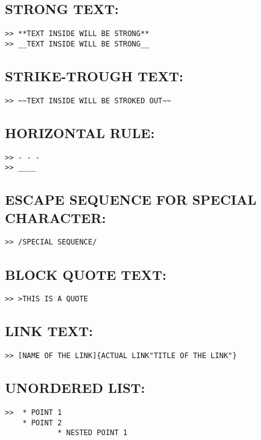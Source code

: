 \documentclass[11pt,british]{article}
\begin{document}
\subsection{STRONG TEXT:}
\begin{verbatim}
>> **TEXT INSIDE WILL BE STRONG**
>> __TEXT INSIDE WILL BE STRONG__
\end{verbatim}

\subsection{STRIKE-TROUGH TEXT:}
\begin{verbatim}
>> ~~TEXT INSIDE WILL BE STROKED OUT~~
\end{verbatim}

\subsection{HORIZONTAL RULE:}
\begin{verbatim}
>> - - -
>> ____
\end{verbatim}

\subsection{ESCAPE SEQUENCE FOR SPECIAL CHARACTER:}
\begin{verbatim}
>> /SPECIAL SEQUENCE/
\end{verbatim}

\subsection{BLOCK QUOTE TEXT:}
\begin{verbatim}
>> >THIS IS A QUOTE
\end{verbatim}

\subsection{LINK TEXT:}
\begin{verbatim}
>> [NAME OF THE LINK]{ACTUAL LINK"TITLE OF THE LINK"}
\end{verbatim}

\subsection{UNORDERED LIST:}
\begin{verbatim}
>>  * POINT 1
	* POINT 2
			* NESTED POINT 1
\end{verbatim}
\end{document}
